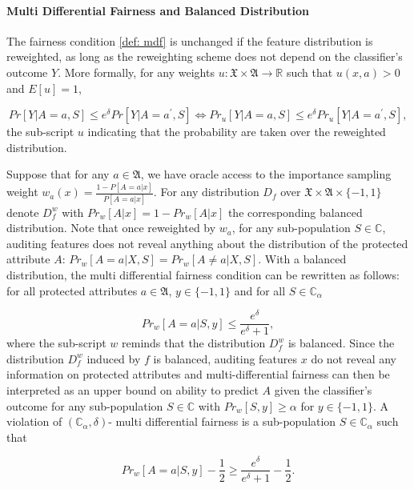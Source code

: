 \documentclass{article}
\begin{document}
\paragraph{Multi Differential Fairness and Balanced Distribution}
The fairness condition \ref{def: mdf} is unchanged if the feature distribution is reweighted, as long as the reweighting scheme does not depend on the classifier's outcome $Y$. More formally, for any weights $u: \mathfrak{X}\times \mathfrak{A} \rightarrow \mathbb{R}$ such that $u(x,a)> 0$ and $E[u]=1$, 

\begin{equation}
Pr[Y|A=a, S] \leq e^{\delta} Pr[Y|A=a^{'}, S] \iff Pr_{u}[Y|A=a, S] \leq e^{\delta} Pr_{u}[Y|A=a^{'}, S],
\end{equation}
the sub-script $u$ indicating that the probability are taken over the reweighted distribution. 

\bigskip
Suppose that for any $a \in \mathfrak{A}$, we have oracle access to the importance sampling weight $w_{a}(x)=\frac{1 - P[A=a|x]}{P[A=a|x]}$. For any distribution $D_{f}$ over $\mathfrak{X} \times \mathfrak{A}\times \{-1, 1\}$ denote $D_{f}^{w}$ with $Pr_{w}[A|x]= 1 - Pr_{w}[A|x]$ the corresponding balanced distribution. Note that once reweighted by $w_{a}$, for any sub-population $S\in \mathbb{C}$, auditing features does not reveal anything about the distribution of the protected attribute $A$: $Pr_{w}[A=a|X, S]=Pr_{w}[A\neq a|X, S]$. With a balanced distribution, the multi differential fairness condition can be rewritten as follows: for all protected attributes $a\in \mathfrak{A}$, $y\in \{-1,1\}$ and for all $S\in \mathbb{C}_{\alpha}$

\begin{equation}
    \label{eq: mdf_w}
    Pr_{w}[A=a |S, y] \leq \frac{e^{\delta}}{e^{\delta} + 1},
\end{equation}
where the sub-script $w$ reminds that the distribution $D_{f}^{w}$ is balanced. Since the distribution $D_{f}^{w}$ induced by $f$ is balanced, auditing features $x$ do not reveal any information on protected attributes and multi-differential fairness can then be interpreted as an upper bound on ability to predict $A$ given the classifier's outcome for any sub-population $S\in \mathbb{C}$ with $Pr_{w}[S, y] \geq \alpha$ for $y\in\{-1, 1\}$.  A violation of $(\mathbb{C}_{\alpha}, \delta)$- multi differential fairness is a sub-population $S\in \mathbb{C}_{\alpha}$ such that 

\begin{equation}
    \label{eq: mdf_viol1}
    Pr_{w}[A=a |S, y] - \frac{1}{2}\geq \frac{e^{\delta}}{e^{\delta} + 1} - \frac{1}{2}. 
\end{equation}
\end{document}
